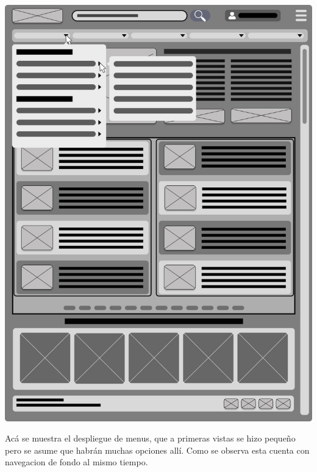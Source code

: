 \documentclass[a4paper,12pt]{article}
\begin{document}
\begin{itemize}
\par \includegraphics[scale=0.85]{m2} \par

Acá se muestra el despliegue de menus, que a primeras vistas se hizo pequeño pero se asume que habrán muchas opciones allí. Como se observa esta cuenta con navegacion de fondo al mismo tiempo.


\end{itemize}
\end{document}
